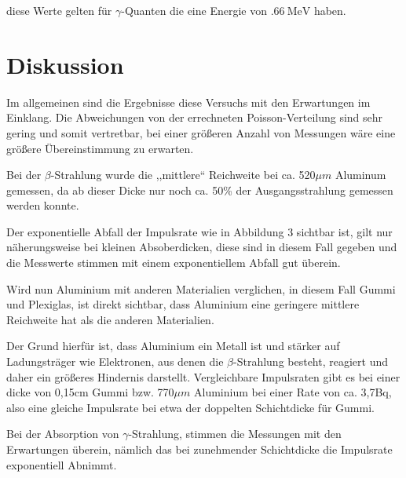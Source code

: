 diese Werte gelten für $\gamma$-Quanten die eine Energie von $ \SI{.66}{\MeV} $
haben.
\newpage
\section{Diskussion}

Im allgemeinen sind die Ergebnisse diese Versuchs mit den Erwartungen
im Einklang. Die Abweichungen von der errechneten Poisson-Verteilung
sind sehr gering und somit vertretbar, bei einer größeren Anzahl von
Messungen wäre eine größere Übereinstimmung zu erwarten.

Bei der $\beta$-Strahlung wurde die ,,mittlere`` Reichweite bei
ca. 520$\mu m$ Aluminum gemessen, da ab dieser Dicke nur noch ca.
50\% der Ausgangsstrahlung gemessen werden konnte.

Der exponentielle Abfall der Impulsrate wie in Abbildung 3 sichtbar
ist, gilt nur näherungsweise bei kleinen Absoberdicken, diese sind
in diesem Fall gegeben und die Messwerte stimmen mit einem exponentiellem
Abfall gut überein.

Wird nun Aluminium mit anderen Materialien verglichen, in diesem Fall
Gummi und Plexiglas, ist direkt sichtbar, dass Aluminium eine geringere
mittlere Reichweite hat als die anderen Materialien.

Der Grund hierfür ist, dass Aluminium ein Metall ist und stärker auf
Ladungsträger wie Elektronen, aus denen die $\beta$-Strahlung besteht,
reagiert und daher ein größeres Hindernis darstellt. Vergleichbare
Impulsraten gibt es bei einer dicke von 0,15cm Gummi bzw. 770$\mu m$
Aluminium bei einer Rate von ca. 3,7Bq, also eine gleiche Impulsrate
bei etwa der doppelten Schichtdicke für Gummi.

Bei der Absorption von $\gamma$-Strahlung, stimmen die Messungen
mit den Erwartungen überein, nämlich das bei zunehmender Schichtdicke
die Impulsrate exponentiell Abnimmt.